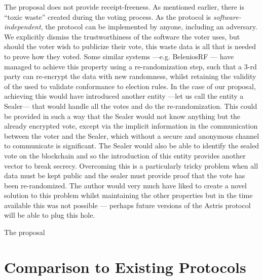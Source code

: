 The proposal does not provide receipt-freeness. As mentioned earlier, there is ``toxic waste'' created during the voting process. As the protocol is \emph{software-independent}, the protocol can be implemented by anyone, including an adversary. We explicitly dismiss the trustworthiness of the software the voter uses, but should the voter wish to publicize their vote, this waste data is all that is needed to prove how they voted. Some similar systems ---e.g. BeleniosRF \cite{cortierBeleniosSimplePrivate2019}--- have managed to achieve this property using a re-randomization step, such that a 3-rd party can re-encrypt the data with new randomness, whilst retaining the validity of the  used to validate conformance to election rules. In the case of our proposal, achieving this would have introduced another entity ---let us call the entity a Sealer--- that would handle all the votes and do the re-randomization. This could be provided in such a way that the Sealer would not know anything but the already encrypted vote, except via the implicit information in the communication between the voter and the Sealer, which without a secure and anonymous channel to communicate is significant. The Sealer would also be able to identify the sealed vote on the blockchain and so the introduction of this entity provides another vector to break secrecy. Overcoming this is a particularly tricky problem when all data must be kept public and the sealer must provide proof that the vote has been re-randomized. The author would very much have liked to create a novel solution to this problem whilst maintaining the other properties but in the time available this was not possible --- perhaps future versions of the Astris protocol will be able to plug this hole.

The proposal





\section{Comparison to Existing Protocols}
\label{ch:analysis:comparison}

